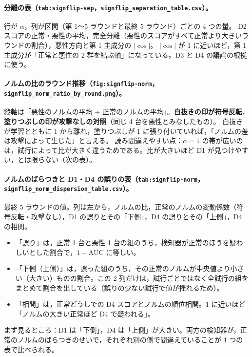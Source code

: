 \documentclass[a4j, dvipdfmx]{jsarticle}  %
\begin{document}
\paragraph{分離の表（\texttt{tab:signflip-sep}，\texttt{signflip\_separation\_table.csv}）。}
行が $\alpha$，列が区間（第 1〜5 ラウンドと最終 5 ラウンド）ごとの 4 つの量。
D2 スコアの正常・悪性の平均，完全分離（悪性のスコアがすべて正常より大きいラウンドの割合），悪性方向と第 1 主成分の $|\cos|$。
$|\cos|$ が 1 に近いほど，第 1 主成分が「正常と悪性の 2 群を結ぶ軸」になっている。D3 と D4 の議論の根拠に使う。

\paragraph{ノルムの比のラウンド推移（\texttt{fig:signflip-norm}，\texttt{signflip\_norm\_ratio\_by\_round.png}）。}
縦軸は「悪性のノルムの平均 $\div$ 正常のノルムの平均」。\textbf{白抜きの印が符号反転}，\textbf{塗りつぶしの印が攻撃なしの対照}（同じ 4 台を悪性とみなしたもの）。
白抜きが学習とともに 1 から離れ，塗りつぶしが 1 に張り付いていれば，「ノルムの差は攻撃によって生じた」と言える。
読み間違えやすい点：$\alpha = 1$ の帯が広いのは，試行によって比が大きく違うためである。比が大きいほど D1 が見つけやすい，とは限らない（次の表）。

\paragraph{ノルムのばらつきと D1・D4 の誤りの表（\texttt{tab:signflip-norm}，\texttt{signflip\_norm\_dispersion\_table.csv}）。}
最終 5 ラウンドの値。列は左から，ノルムの比，正常のノルムの変動係数（符号反転・攻撃なし），D1 の誤りとその「下側」，D4 の誤りとその「上側」，D4 の相関。
\begin{itemize}
  \item 「誤り」は，正常 1 台と悪性 1 台の組のうち，検知器が正常のほうを疑わしいとした割合で，$1 - \mathrm{AUC}$ に等しい。
  \item 「下側（上側）」は，誤った組のうち，その正常のノルムが中央値より小さい（大きい）ものの割合。この 2 列だけは，試行ごとではなく全試行の組をまとめて割合を出している（誤りの少ない試行で値が揺れるため）。
  \item 「相関」は，正常どうしでの D4 スコアとノルムの順位相関。1 に近いほど「ノルムの大きい正常ほど D4 で疑われる」。
\end{itemize}
まず見るところ：D1 は「下側」，D4 は「上側」が大きい。両方の検知器が，正常のノルムのばらつきのせいで，それぞれ別の側で間違えていることが 1 つの表で比べられる。
\end{document}
